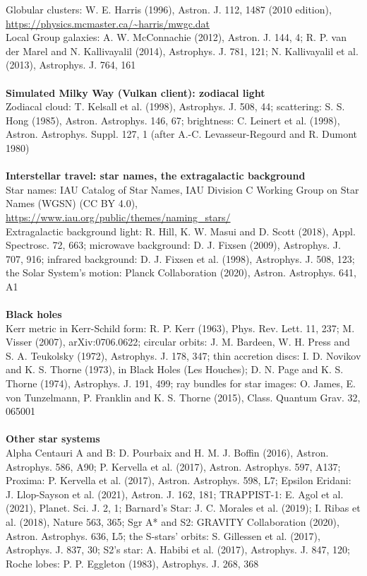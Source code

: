 \documentclass[Orbiter User Manual.tex]{subfiles}
\begin{document}
Globular clusters: W. E. Harris (1996), Astron. J. 112, 1487 (2010 edition), \url{https://physics.mcmaster.ca/~harris/mwgc.dat}\\
Local Group galaxies: A. W. McConnachie (2012), Astron. J. 144, 4; R. P. van der Marel and N. Kallivayalil (2014), Astrophys. J. 781, 121; N. Kallivayalil et al. (2013), Astrophys. J. 764, 161\\
\\
\textbf{Simulated Milky Way (Vulkan client): zodiacal light}\\
Zodiacal cloud: T. Kelsall et al. (1998), Astrophys. J. 508, 44; scattering: S. S. Hong (1985), Astron. Astrophys. 146, 67; brightness: C. Leinert et al. (1998), Astron. Astrophys. Suppl. 127, 1 (after A.-C. Levasseur-Regourd and R. Dumont 1980)\\
\\
\textbf{Interstellar travel: star names, the extragalactic background}\\
Star names: IAU Catalog of Star Names, IAU Division C Working Group on Star Names (WGSN) (CC BY 4.0), \url{https://www.iau.org/public/themes/naming_stars/}\\
Extragalactic background light: R. Hill, K. W. Masui and D. Scott (2018), Appl. Spectrosc. 72, 663; microwave background: D. J. Fixsen (2009), Astrophys. J. 707, 916; infrared background: D. J. Fixsen et al. (1998), Astrophys. J. 508, 123; the Solar System's motion: Planck Collaboration (2020), Astron. Astrophys. 641, A1\\
\\
\textbf{Black holes}\\
Kerr metric in Kerr-Schild form: R. P. Kerr (1963), Phys. Rev. Lett. 11, 237; M. Visser (2007), arXiv:0706.0622; circular orbits: J. M. Bardeen, W. H. Press and S. A. Teukolsky (1972), Astrophys. J. 178, 347; thin accretion discs: I. D. Novikov and K. S. Thorne (1973), in Black Holes (Les Houches); D. N. Page and K. S. Thorne (1974), Astrophys. J. 191, 499; ray bundles for star images: O. James, E. von Tunzelmann, P. Franklin and K. S. Thorne (2015), Class. Quantum Grav. 32, 065001\\
\\
\textbf{Other star systems}\\
Alpha Centauri A and B: D. Pourbaix and H. M. J. Boffin (2016), Astron. Astrophys. 586, A90; P. Kervella et al. (2017), Astron. Astrophys. 597, A137; Proxima: P. Kervella et al. (2017), Astron. Astrophys. 598, L7; Epsilon Eridani: J. Llop-Sayson et al. (2021), Astron. J. 162, 181; TRAPPIST-1: E. Agol et al. (2021), Planet. Sci. J. 2, 1; Barnard's Star: J. C. Morales et al. (2019); I. Ribas et al. (2018), Nature 563, 365; Sgr A* and S2: GRAVITY Collaboration (2020), Astron. Astrophys. 636, L5; the S-stars' orbits: S. Gillessen et al. (2017), Astrophys. J. 837, 30; S2's star: A. Habibi et al. (2017), Astrophys. J. 847, 120; Roche lobes: P. P. Eggleton (1983), Astrophys. J. 268, 368\\
\end{document}
